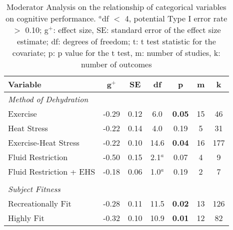 \begin{table}
	\caption{Moderator Analysis on the relationship of categorical variables on cognitive performance. ${^a}$df ${<}$ 4, potential Type I error rate ${>}$ 0.10; g${^+}$: effect size, SE: standard error of the effect size estimate; df: degrees of freedom; t: t test statistic for the covariate; p: p value for the t test, m: number of studies, k: number of outcomes}
	\centering
	
	\begin{tabular}{lcccccc} 
		\hline
		\textbf{Variable} & \textbf{g${^+}$} & \textbf{SE} & \textbf{df} & \textbf{p} & \textbf{m} & 
		\textbf{k} \\
		\hline
		\textit{Method of Dehydration} &&&&&& \\
		Exercise & -0.29 & 0.12 & 6.0 & \textbf{0.05} & 15 & 46 \\
		Heat Stress & -0.22 & 0.14 & 4.0 & 0.19 & 5 & 31 \\
		Exercise-Heat Stress & -0.22 & 0.10 & 14.6 & \textbf{0.04} & 16 & 177 \\
		Fluid Restriction & -0.50 & 0.15 & 2.1${^a}$ & 0.07 & 4 & 9 \\
		Fluid Restriction + EHS	& -0.18 & 0.06 & 1.0${^a}$ & 0.19 & 2 & 7 \\
		&&&&&& \\
		\textit{Subject Fitness} &&&&&& \\
		Recreationally Fit & -0.28 & 0.11 & 11.5 & \textbf{0.02} & 13 & 126 \\
		Highly Fit &  -0.32 & 0.10 & 10.9 & \textbf{0.01} & 12 & 82 \\ 
		\hline	    
	\end{tabular}
	\label{tbl:moderators}
\end{table}

